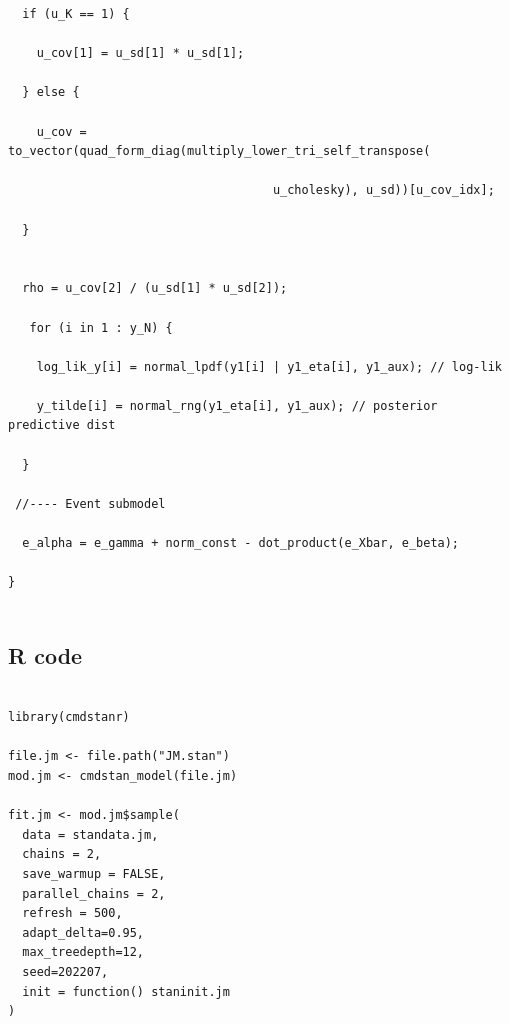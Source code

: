 \begin{SingleSpace}
\begin{verbatim}
  if (u_K == 1) {

    u_cov[1] = u_sd[1] * u_sd[1];

  } else {

    u_cov = to_vector(quad_form_diag(multiply_lower_tri_self_transpose(

                                     u_cholesky), u_sd))[u_cov_idx];

  }


  rho = u_cov[2] / (u_sd[1] * u_sd[2]);
  
   for (i in 1 : y_N) {

    log_lik_y[i] = normal_lpdf(y1[i] | y1_eta[i], y1_aux); // log-lik 

    y_tilde[i] = normal_rng(y1_eta[i], y1_aux); // posterior predictive dist

  }

 //---- Event submodel

  e_alpha = e_gamma + norm_const - dot_product(e_Xbar, e_beta);

}


\end{verbatim}

\subsection{R code}

    \begin{verbatim}

library(cmdstanr)

file.jm <- file.path("JM.stan")
mod.jm <- cmdstan_model(file.jm)

fit.jm <- mod.jm$sample(
  data = standata.jm,
  chains = 2, 
  save_warmup = FALSE,
  parallel_chains = 2,
  refresh = 500,
  adapt_delta=0.95,
  max_treedepth=12,
  seed=202207,
  init = function() staninit.jm
)

\end{verbatim}

\end{SingleSpace}

